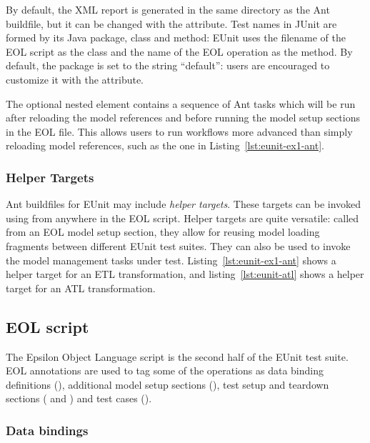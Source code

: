 By default, the XML report is generated in the same directory as the Ant buildfile, but it can be changed with the  attribute. Test names in JUnit are formed by its Java package, class and method: EUnit uses the filename of the EOL script as the class and the name of the EOL operation as the method. By default, the package is set to the string ``default'': users are encouraged to customize it with the  attribute.

The optional  nested element contains a sequence of Ant tasks which will be run after reloading the model references and before running the model setup sections in the EOL file. This allows users to run workflows more advanced than simply reloading model references, such as the one in Listing~\ref{lst:eunit-ex1-ant}.

\subsubsection{Helper Targets}

Ant buildfiles for EUnit may include \emph{helper targets}. These targets can be invoked using  from anywhere in the EOL script. Helper targets are quite versatile: called from an EOL model setup section, they allow for reusing model loading fragments between different EUnit test suites. They can also be used to invoke the model management tasks under test. Listing~\ref{lst:eunit-ex1-ant} shows a helper target for an ETL transformation, and listing~\ref{lst:eunit-atl} shows a helper target for an ATL transformation.

\subsection{EOL script}
\label{sec:eunit-eol-script}

The Epsilon Object Language script is the second half of the EUnit test suite. EOL annotations are used to tag some of the operations as data binding definitions (), additional model setup sections (), test setup and teardown sections ( and ) and test cases ().

\subsubsection{Data bindings}

